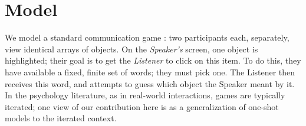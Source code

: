 \documentclass{article} %
\begin{document}
\section{Model}

We model a standard communication game \cite{krauss1964,clark1986}: two participants each,
separately, view identical arrays of objects. On the \textit{Speaker's} screen, one object is highlighted; their goal is to get the \textit{Listener} to click on this item. To do this, they have available a fixed, finite set of words; they must pick one. The Listener then receives this word, and attempts to guess which object
the Speaker meant by it. In the psychology literature, as in real-world interactions, games are typically iterated; one view of our contribution here is as a generalization of one-shot models \cite{frank2012,bergen2012} to the iterated context.
\end{document}
